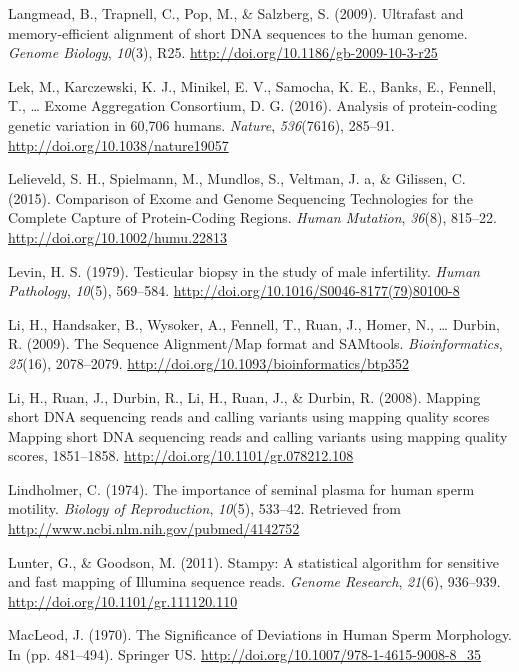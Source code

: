 \documentclass[12pt,twoside]{reedthesis}
\theoremstyle{definition}
\theoremstyle{definition}
\theoremstyle{remark}
\begin{document}
  \hypertarget{ref-Langmead2009}{}
  Langmead, B., Trapnell, C., Pop, M., \& Salzberg, S. (2009). Ultrafast
  and memory-efficient alignment of short DNA sequences to the human
  genome. \emph{Genome Biology}, \emph{10}(3), R25.
  \url{http://doi.org/10.1186/gb-2009-10-3-r25}
  
  \hypertarget{ref-Lek2016}{}
  Lek, M., Karczewski, K. J., Minikel, E. V., Samocha, K. E., Banks, E.,
  Fennell, T., \ldots{} Exome Aggregation Consortium, D. G. (2016).
  Analysis of protein-coding genetic variation in 60,706 humans.
  \emph{Nature}, \emph{536}(7616), 285--91.
  \url{http://doi.org/10.1038/nature19057}
  
  \hypertarget{ref-Lelieveld2015}{}
  Lelieveld, S. H., Spielmann, M., Mundlos, S., Veltman, J. a, \&
  Gilissen, C. (2015). Comparison of Exome and Genome Sequencing
  Technologies for the Complete Capture of Protein-Coding Regions.
  \emph{Human Mutation}, \emph{36}(8), 815--22.
  \url{http://doi.org/10.1002/humu.22813}
  
  \hypertarget{ref-Levin1979}{}
  Levin, H. S. (1979). Testicular biopsy in the study of male infertility.
  \emph{Human Pathology}, \emph{10}(5), 569--584.
  \url{http://doi.org/10.1016/S0046-8177(79)80100-8}
  
  \hypertarget{ref-Li2009}{}
  Li, H., Handsaker, B., Wysoker, A., Fennell, T., Ruan, J., Homer, N.,
  \ldots{} Durbin, R. (2009). The Sequence Alignment/Map format and
  SAMtools. \emph{Bioinformatics}, \emph{25}(16), 2078--2079.
  \url{http://doi.org/10.1093/bioinformatics/btp352}
  
  \hypertarget{ref-Li2008}{}
  Li, H., Ruan, J., Durbin, R., Li, H., Ruan, J., \& Durbin, R. (2008).
  Mapping short DNA sequencing reads and calling variants using mapping
  quality scores Mapping short DNA sequencing reads and calling variants
  using mapping quality scores, 1851--1858.
  \url{http://doi.org/10.1101/gr.078212.108}
  
  \hypertarget{ref-Lindholmer1974}{}
  Lindholmer, C. (1974). The importance of seminal plasma for human sperm
  motility. \emph{Biology of Reproduction}, \emph{10}(5), 533--42.
  Retrieved from \url{http://www.ncbi.nlm.nih.gov/pubmed/4142752}
  
  \hypertarget{ref-Lunter2011}{}
  Lunter, G., \& Goodson, M. (2011). Stampy: A statistical algorithm for
  sensitive and fast mapping of Illumina sequence reads. \emph{Genome
  Research}, \emph{21}(6), 936--939.
  \url{http://doi.org/10.1101/gr.111120.110}
  
  \hypertarget{ref-MacLeod1970}{}
  MacLeod, J. (1970). The Significance of Deviations in Human Sperm
  Morphology. In (pp. 481--494). Springer US.
  \url{http://doi.org/10.1007/978-1-4615-9008-8_35}
  
\end{document}
